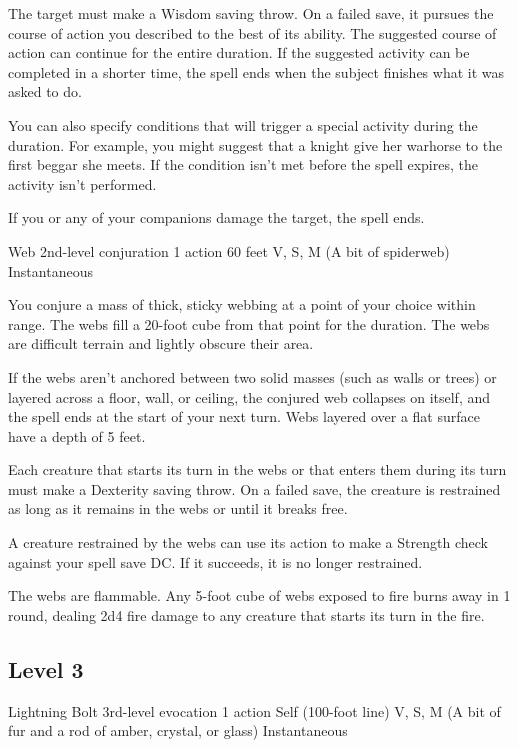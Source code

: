 \documentclass[a4paper,openany,twocolumn]{book}
\begin{document}
The target must make a Wisdom saving throw. On a failed save, it pursues the course of action you described to the best of its ability. The suggested course of action can continue for the entire duration. If the suggested activity can be completed in a shorter time, the spell ends when the subject finishes what it was asked to do.

You can also specify conditions that will trigger a special activity during the duration. For example, you might suggest that a knight give her warhorse to the first beggar she meets. If the condition isn’t met before the spell expires, the activity isn’t performed.

If you or any of your companions damage the target, the spell ends.

\DndSpellHeader
  {Web}
  {2nd-level conjuration}
  {1 action}
  {60 feet}
  {V, S, M (A bit of spiderweb)}
  {Instantaneous}

You conjure a mass of thick, sticky webbing at a point of your choice within range. The webs fill a 20-foot cube from that point for the duration. The webs are difficult terrain and lightly obscure their area.

If the webs aren’t anchored between two solid masses (such as walls or trees) or layered across a floor, wall, or ceiling, the conjured web collapses on itself, and the spell ends at the start of your next turn. Webs layered over a flat surface have a depth of 5 feet.

Each creature that starts its turn in the webs or that enters them during its turn must make a Dexterity saving throw. On a failed save, the creature is restrained as long as it remains in the webs or until it breaks free.

A creature restrained by the webs can use its action to make a Strength check against your spell save DC. If it succeeds, it is no longer restrained.

The webs are flammable. Any 5-foot cube of webs exposed to fire burns away in 1 round, dealing 2d4 fire damage to any creature that starts its turn in the fire.

\subsection*{Level 3}

\DndSpellHeader
  {Lightning Bolt}
  {3rd-level evocation}
  {1 action}
  {Self (100-foot line)}
  {V, S, M (A bit of fur and a rod of amber, crystal, or glass)}
  {Instantaneous}
\end{document}
